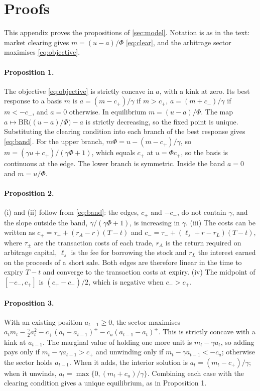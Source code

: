 \section{Proofs}\label{app:proofs}

This appendix proves the propositions of \cref{sec:model}. Notation is as in the text: market clearing gives
$m=(u-a)/\Phi$ \eqref{eq:clear}, and the arbitrage sector maximises \eqref{eq:objective}.

\paragraph{Proposition 1.} The objective \eqref{eq:objective} is strictly concave in $a$, with a kink at zero. Its best
response to a basis $m$ is $a=(m-c_+)/\gamma$ if $m>c_+$, $a=(m+c_-)/\gamma$ if $m<-c_-$, and $a=0$ otherwise. In
equilibrium $m=(u-a)/\Phi$. The map $a\mapsto \mathrm{BR}\big((u-a)/\Phi\big)-a$ is strictly decreasing, so the fixed point
is unique. Substituting the clearing condition into each branch of the best response gives \eqref{eq:band}. For the
upper branch, $m\Phi=u-(m-c_+)/\gamma$, so $m=(\gamma u+c_+)/(\gamma\Phi+1)$, which equals $c_+$ at $u=\Phi c_+$, so the
basis is continuous at the edge. The lower branch is symmetric. Inside the band $a=0$ and $m=u/\Phi$.

\paragraph{Proposition 2.} (i) and (ii) follow from \eqref{eq:band}: the edges, $c_+$ and $-c_-$, do not contain
$\gamma$, and the slope outside the band, $\gamma/(\gamma\Phi+1)$, is increasing in $\gamma$. (iii) The costs can be
written as $c_+=\tau_++(r_A-r)(T-t)$ and $c_-=\tau_-+(\ell_s+r-r_L)(T-t)$, where $\tau_\pm$ are the transaction costs of
each trade, $r_A$ is the return required on arbitrage capital, $\ell_s$ is the fee for borrowing the stock and $r_L$ the
interest earned on the proceeds of a short sale. Both edges are therefore linear in the time to expiry $T-t$ and converge
to the transaction costs at expiry. (iv) The midpoint of $[-c_-,c_+]$ is $(c_+-c_-)/2$, which is negative when $c_->c_+$.

\paragraph{Proposition 3.} With an existing position $a_{t-1}\ge 0$, the sector maximises
$a_tm_t-\tfrac{\gamma}{2}a_t^2-c_+(a_t-a_{t-1})^+-c_u(a_{t-1}-a_t)^+$. This is strictly concave with a kink at
$a_{t-1}$. The marginal value of holding one more unit is $m_t-\gamma a_t$, so adding pays only if
$m_t-\gamma a_{t-1}>c_+$ and unwinding only if $m_t-\gamma a_{t-1}<-c_u$; otherwise the sector holds $a_{t-1}$. When it
adds, the interior solution is $a_t=(m_t-c_+)/\gamma$; when it unwinds, $a_t=\max\{0,(m_t+c_u)/\gamma\}$. Combining each
case with the clearing condition gives a unique equilibrium, as in Proposition 1.


